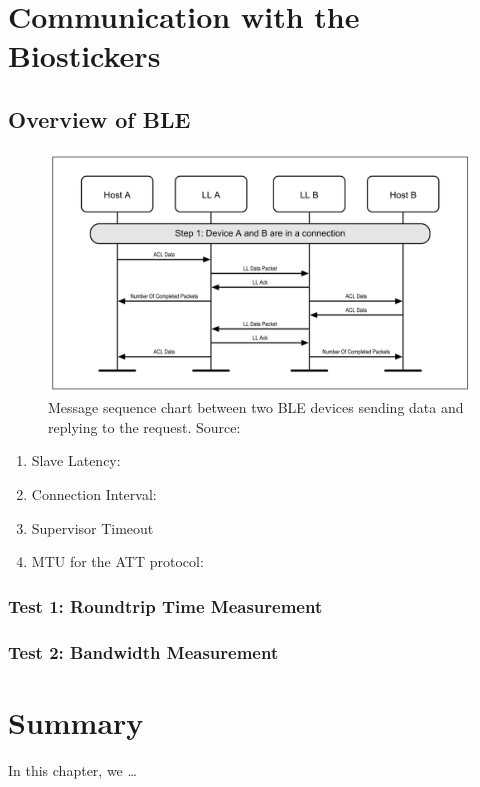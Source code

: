 \section{Communication with the Biostickers}

\subsection{Overview of \acf{BLE}}

\begin{figure}[H]
    \centering
    \includegraphics[width=\linewidth]{images/ble-sending-data.PNG}
    \caption[Message sequence chart between two \acs{BLE} devices sending data and replying to the request.]{Message sequence chart between two \acs{BLE} devices sending data and replying to the request. Source: \cite{Specification1999}}
    \label{fig:differences-between-cloud-services}
\end{figure}


\begin{enumerate}
    \item Slave Latency:
    \item Connection Interval:
    \item Supervisor Timeout
    \item \acs{MTU} for the \acs{ATT} protocol: 
\end{enumerate}

\subsubsection{Test 1: Roundtrip Time Measurement}

\subsubsection{Test 2: Bandwidth Measurement}


\section{Summary}
In this chapter, we \dots